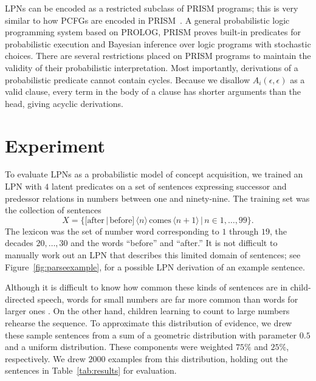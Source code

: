 \documentclass[10pt, twocolumn]{article}
\begin{document}
LPNs can be encoded as a restricted subclass of PRISM programs; this
is very similar to how PCFGs are encoded in
PRISM~\cite{DBLP:conf/cl/2000}. A general probabilistic logic
programming system based on PROLOG, PRISM proves built-in predicates
for probabilistic execution and Bayesian inference over logic programs
with stochastic choices. There are several
restrictions placed on PRISM programs to maintain the validity of
their probabilistic interpretation. Most importantly, derivations of a
probabilistic predicate cannot contain cycles. Because we disallow
$A_i(\epsilon,\epsilon)$ as a valid clause, every term in the body of a clause
has shorter arguments than the head, giving acyclic derivations.


\section{Experiment}

To evaluate LPNs as a probabilistic model of concept acquisition, we
trained an LPN with $4$ latent predicates on a set of sentences
expressing successor and predessor relations in numbers between one
and ninety-nine. The training set was the collection of sentences $$X
= \{[\text{after}\, | \, \text{before}] \, \langle n \rangle \,
\text{comes} \, \langle n+1 \rangle \,|\, n \in 1,\dots,99\}.$$ The
lexicon was the set of number word corresponding to $1$ through $19$,
the decades $20, \dots, 30$ and the words ``before'' and ``after.'' It
is not difficult to manually work out an LPN that describes this
limited domain of sentences; see Figure~\ref{fig:parseexample}, for a
possible LPN derivation of an example sentence.

Although it is difficult to know how common these kinds of sentences
are in child-directed speech, words for small numbers are far more
common than words for larger ones \cite{macwhinney2000childes}. On the
other hand, children learning to count to large numbers rehearse the
sequence. To approximate this distribution of evidence, we drew these
sample sentences from a sum of a geometric distribution with parameter
$0.5$ and a uniform distribution. These components were weighted
$75\%$ and $25\%$, respectively. We drew $2000$ examples from this
distribution, holding out the sentences in Table~\ref{tab:results} for
evaluation.
\end{document}
